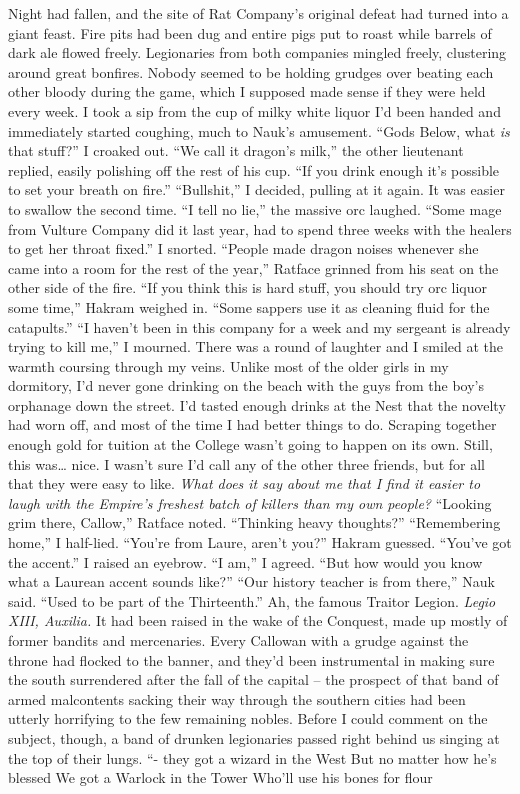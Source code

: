 \documentclass[12pt, openany]{book}
\begin{document}
Night had fallen, and the site of Rat Company’s original defeat had turned into a giant feast. Fire pits had been dug and entire pigs put to roast while barrels of dark ale flowed freely. Legionaries from both companies mingled freely, clustering around great bonfires. Nobody seemed to be holding grudges over beating each other bloody during the game, which I supposed made sense if they were held every week. I took a sip from the cup of milky white liquor I’d been handed and immediately started coughing, much to Nauk’s amusement.
“Gods Below, what \textit{is} that stuff?” I croaked out.
“We call it dragon’s milk,” the other lieutenant replied, easily polishing off the rest of his cup. “If you drink enough it’s possible to set your breath on fire.”
“Bullshit,” I decided, pulling at it again. It was easier to swallow the second time.
“I tell no lie,” the massive orc laughed. “Some mage from Vulture Company did it last year, had to spend three weeks with the healers to get her throat fixed.”
I snorted.
“People made dragon noises whenever she came into a room for the rest of the year,” Ratface grinned from his seat on the other side of the fire.
“If you think this is hard stuff, you should try orc liquor some time,” Hakram weighed in. “Some sappers use it as cleaning fluid for the catapults.”
“I haven’t been in this company for a week and my sergeant is already trying to kill me,” I mourned.
There was a round of laughter and I smiled at the warmth coursing through my veins. Unlike most of the older girls in my dormitory, I’d never gone drinking on the beach with the guys from the boy’s orphanage down the street. I’d tasted enough drinks at the Nest that the novelty had worn off, and most of the time I had better things to do. Scraping together enough gold for tuition at the College wasn’t going to happen on its own. Still, this was… nice. I wasn’t sure I’d call any of the other three friends, but for all that they were easy to like. \textit{What does it say about me that I find it easier to laugh with the Empire’s freshest batch of killers than my own people?}
“Looking grim there, Callow,” Ratface noted. “Thinking heavy thoughts?”
“Remembering home,” I half-lied.
“You’re from Laure, aren’t you?” Hakram guessed. “You’ve got the accent.”
I raised an eyebrow. “I am,” I agreed. “But how would you know what a Laurean accent sounds like?”
“Our history teacher is from there,” Nauk said. “Used to be part of the Thirteenth.”
Ah, the famous Traitor Legion. \textit{Legio XIII, Auxilia.} It had been raised in the wake of the Conquest, made up mostly of former bandits and mercenaries. Every Callowan with a grudge against the throne had flocked to the banner, and they’d been instrumental in making sure the south surrendered after the fall of the capital – the prospect of that band of armed malcontents sacking their way through the southern cities had been utterly horrifying to the few remaining nobles. Before I could comment on the subject, though, a band of drunken legionaries passed right behind us singing at the top of their lungs.
“- they got a wizard in the West
But no matter how he’s blessed
We got a Warlock in the Tower
Who’ll use his bones for flour
\end{document}
